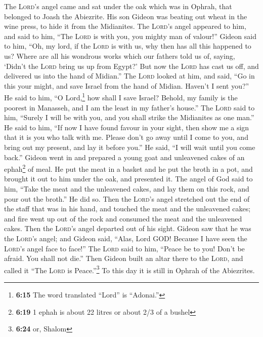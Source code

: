  The \textsc{Lord}'s angel came and sat under the oak
which was in Ophrah, that belonged to Joash the Abiezrite. His son
Gideon was beating out wheat in the wine press, to hide it from the
Midianites.  The \textsc{Lord}'s angel appeared to him,
and said to him, ``The \textsc{Lord} is with you, you mighty man of
valour!''  Gideon said to him, ``Oh, my lord, if the
\textsc{Lord} is with us, why then has all this happened to us? Where
are all his wondrous works which our fathers told us of, saying, `Didn't
the \textsc{Lord} bring us up from Egypt?' But now the \textsc{Lord} has
cast us off, and delivered us into the hand of Midian.'' 
The \textsc{Lord} looked at him, and said, ``Go in this your might, and
save Israel from the hand of Midian. Haven't I sent you?''
 He said to him, ``O Lord,\footnote{\textbf{6:15} The
  word translated ``Lord'' is ``Adonai.''} how shall I save Israel?
Behold, my family is the poorest in Manasseh, and I am the least in my
father's house.''  The \textsc{Lord} said to him,
``Surely I will be with you, and you shall strike the Midianites as one
man.''  He said to him, ``If now I have found favour in
your sight, then show me a sign that it is you who talk with me.
 Please don't go away until I come to you, and bring out
my present, and lay it before you.'' He said, ``I will wait until you
come back.''  Gideon went in and prepared a young goat
and unleavened cakes of an ephah\footnote{\textbf{6:19} 1 ephah is about
  22 litres or about 2/3 of a bushel} of meal. He put the meat in a
basket and he put the broth in a pot, and brought it out to him under
the oak, and presented it.  The angel of God said to him,
``Take the meat and the unleavened cakes, and lay them on this rock, and
pour out the broth.'' He did so.  Then the
\textsc{Lord}'s angel stretched out the end of the staff that was in his
hand, and touched the meat and the unleavened cakes; and fire went up
out of the rock and consumed the meat and the unleavened cakes. Then the
\textsc{Lord}'s angel departed out of his sight.  Gideon
saw that he was the \textsc{Lord}'s angel; and Gideon said, ``Alas, Lord
GOD! Because I have seen the \textsc{Lord}'s angel face to face!''
 The \textsc{Lord} said to him, ``Peace be to you! Don't
be afraid. You shall not die.''  Then Gideon built an
altar there to the \textsc{Lord}, and called it ``The \textsc{Lord} is
Peace.''\footnote{\textbf{6:24} or, Shalom} To this day it is still in
Ophrah of the Abiezrites.

